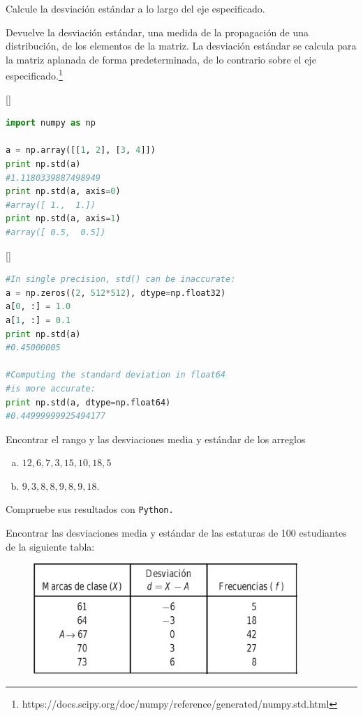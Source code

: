 Calcule la desviación estándar a lo largo del eje especificado.

Devuelve la desviación estándar, una medida de la propagación de una distribución, de los elementos de la matriz. La desviación estándar se calcula para la matriz aplanada de forma predeterminada, de lo contrario sobre el eje especificado.\footnote{https://docs.scipy.org/doc/numpy/reference/generated/numpy.std.html}

[]
\begin{lstlisting}[language=Python]
import numpy as np

a = np.array([[1, 2], [3, 4]])
print np.std(a)
#1.1180339887498949
print np.std(a, axis=0)
#array([ 1.,  1.])
print np.std(a, axis=1)
#array([ 0.5,  0.5])
\end{lstlisting}


[]
\begin{lstlisting}[language=Python]
#In single precision, std() can be inaccurate:
a = np.zeros((2, 512*512), dtype=np.float32)
a[0, :] = 1.0
a[1, :] = 0.1
print np.std(a)
#0.45000005

#Computing the standard deviation in float64
#is more accurate:
print np.std(a, dtype=np.float64)
#0.44999999925494177
\end{lstlisting}





 \begin{problema}
 \label{problema:4.3}
  Encontrar el rango y las desviaciones media y estándar de los arreglos 
  \begin{enumerate}[(a)]
   \item $12,6,7,3,15,10,18,5$ 
   \item $9,3,8,8,9,8,9,18.$
  \end{enumerate}

  Compruebe sus resultados con \texttt{Python.}
 \end{problema}



 
 \begin{problema}
  \label{problema:4.4}
  Encontrar las desviaciones media y estándar de las estaturas de 100 estudiantes de la siguiente tabla:
  \begin{figure}[ht]
  \centering
  \includegraphics[width=10cm,keepaspectratio=true]{./images/tab0302.png}
  \label{tab:0302}
 \end{figure}

 \end{problema}

